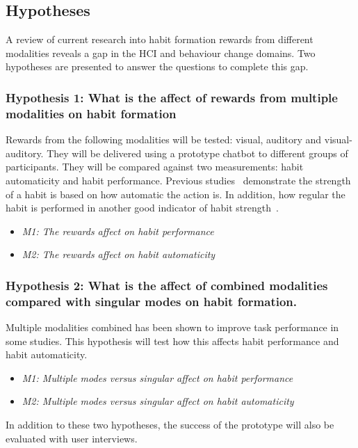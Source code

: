 
\subsection{Hypotheses} \label{hypothese}
A review of current research into habit formation rewards from different modalities reveals a gap in the HCI and behaviour change domains.
Two hypotheses are presented to answer the questions to complete this gap.

\subsubsection*{Hypothesis 1: What is the affect of rewards from multiple modalities on habit formation}
Rewards from the following modalities will be tested: visual, auditory and visual-auditory. They will be delivered using a prototype chatbot to different groups of participants. They will be compared against two measurements: habit automaticity and habit performance. Previous studies~\cite{article_habit_strength, article_4q_SRBAI} demonstrate the strength of a habit is based on how automatic the action is. In addition, how regular the habit is performed in another good indicator of habit strength~\cite{article_promoting_habit_formation, article_experiences_of_habit_formation}.

\begin{itemize}
  \item \textit{M1: The rewards affect on habit performance}
  \item \textit{M2: The rewards affect on habit automaticity}
\end{itemize}

\subsubsection*{Hypothesis 2: What is the affect of combined modalities compared with singular modes on habit formation.}
Multiple modalities combined has been shown to improve task performance in some studies. This hypothesis will test how this affects habit performance and habit automaticity.

\begin{itemize}
  \item \textit{M1: Multiple modes versus singular affect on habit performance}
  \item \textit{M2: Multiple modes versus singular affect on habit automaticity}
\end{itemize}

In addition to these two hypotheses, the success of the prototype will also be evaluated with user interviews.

